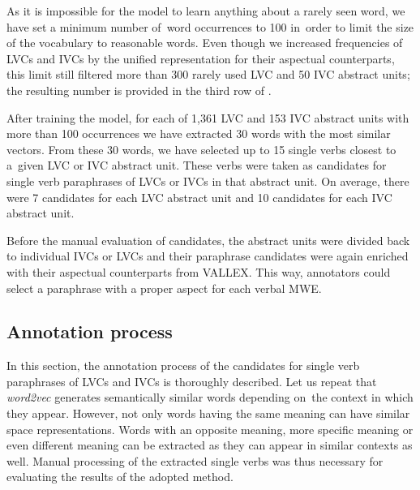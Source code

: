 \documentclass[output=paper
,modfonts
,nonflat]{langsci/langscibook}
\begin{document}
As it is impossible for the model to learn anything about a rarely seen word, we 
have set a minimum number of~word occurrences to 100 in~order to limit the size 
of the vocabulary to reasonable words. Even though we increased frequencies 
of LVCs and IVCs by the unified representation for their aspectual counterparts, 
this limit still filtered more than 300 rarely used LVC and 50 IVC abstract units; 
the resulting number is provided in the third row of .

After training the model, for each of 1,361 LVC and 153 IVC abstract units with 
more than 100 occurrences we have extracted 30 words with the most similar vectors. 
From these 30 words, we have selected up to 15 single verbs closest to a~given 
LVC or IVC abstract unit. These verbs were taken as candidates for single verb 
paraphrases of LVCs or IVCs in that abstract unit. On average, there were 7 
candidates for each LVC abstract unit and 10 candidates for each IVC abstract 
unit.

Before the manual evaluation of candidates, the abstract units were divided 
back to individual IVCs or LVCs and their paraphrase candidates were again 
enriched with their aspectual counterparts from VALLEX. This way, annotators 
could select a paraphrase with a proper aspect for each verbal MWE.

%


\subsection{Annotation process}
\label{baran:sec:annotation}
In this section, the annotation process of the candidates for single verb 
paraphrases of LVCs and IVCs is thoroughly described. Let us repeat that 
\emph{word2vec} generates semantically similar words depending on~the context 
in which they appear. However, not only words having the same meaning can 
have similar space representations. Words with an opposite meaning, more 
specific meaning or even different meaning can be extracted as they can appear 
in similar contexts as well. Manual processing of the extracted single verbs 
was thus necessary for evaluating the results of the adopted method.
\end{document}
